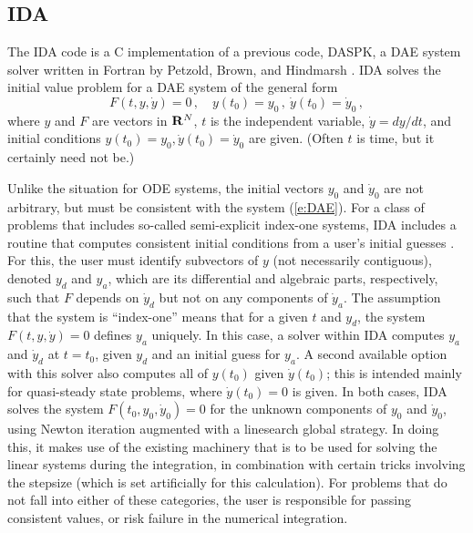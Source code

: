 \subsection{IDA}\label{ss:IDA}

The IDA code is a C implementation of a previous code, DASPK, a DAE
system solver written in Fortran by Petzold, Brown, and Hindmarsh
\cite{BHP:94,BCP:96}.  IDA solves the initial value problem for 
a DAE system of the general form
\begin{equation}\label{e:DAE}
  F(t,y,{\dot y}) = 0 \, ,\quad y(t_0) = y_0 \, ,~ {\dot y}(t_0) = {\dot y}_0 \, ,
\end{equation}
where $y$ and $F$ are vectors in ${\bf R}^N$, $t$ is the independent
variable, ${\dot y} = dy/dt$, 
and initial conditions $y(t_0) = y_0, {\dot y}(t_0) = {\dot y}_0$ 
are given.  (Often $t$ is time, but it certainly need not be.)

Unlike the situation for ODE systems, the initial vectors $y_0$ and
${\dot y}_0$ are not arbitrary, but must be consistent with the system
(\ref{e:DAE}).  For a class of problems that includes so-called
semi-explicit index-one systems, IDA includes a routine that computes
consistent initial conditions from a user's initial guesses
\cite{BHP:98}.  For this, the user must identify subvectors of $y$
(not necessarily contiguous), denoted $y_d$ and $y_a$, which are its
differential and algebraic parts, respectively, such that $F$ depends
on ${\dot y}_d$ but not on any components of ${\dot y}_a$.  The assumption that
the system is ``index-one'' means that for a given $t$ and $y_d$, the
system $F(t,y,{\dot y}) = 0$ defines $y_a$ uniquely.  In this case, a solver
within IDA computes $y_a$ and ${\dot y}_d$ at $t = t_0$, given $y_d$ and an
initial guess for $y_a$.  A second available option with this solver
also computes all of $y(t_0)$ given ${\dot y}(t_0)$; this is intended mainly
for quasi-steady state problems, where ${\dot y}(t_0) = 0$ is given.
In both cases, IDA solves the system $F(t_0,y_0, {\dot y}_0) = 0$ for the
unknown components of $y_0$ and ${\dot y}_0$, using Newton iteration
augmented with a linesearch global strategy.  In doing this, it makes
use of the existing machinery that is to be used for solving the
linear systems during the integration, in combination with certain
tricks involving the stepsize (which is set artificially for this
calculation).
For problems that do not fall into either of these categories, the
user is responsible for passing consistent values, or risk failure in
the numerical integration.


